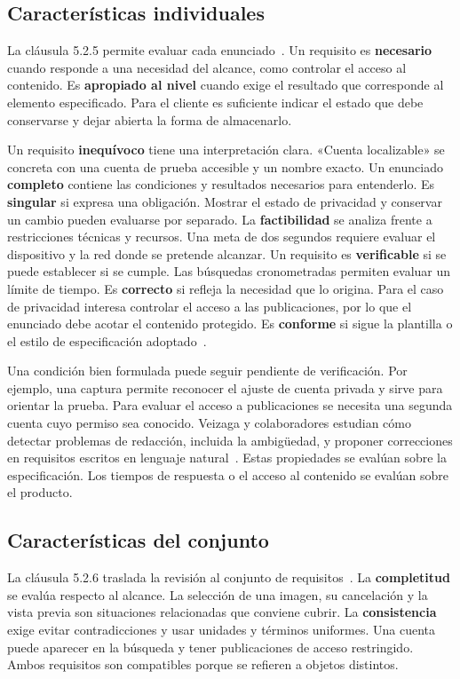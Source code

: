 \documentclass[11pt,a4paper]{article}
\begin{document}
\subsection{Características individuales}
La cláusula 5.2.5 permite evaluar cada enunciado~\cite[cl. 5.2.5]{iso29148}. Un requisito es \textbf{necesario} cuando responde a una necesidad del alcance, como controlar el acceso al contenido. Es \textbf{apropiado al nivel} cuando exige el resultado que corresponde al elemento especificado. Para el cliente es suficiente indicar el estado que debe conservarse y dejar abierta la forma de almacenarlo.

Un requisito \textbf{inequívoco} tiene una interpretación clara. «Cuenta localizable» se concreta con una cuenta de prueba accesible y un nombre exacto. Un enunciado \textbf{completo} contiene las condiciones y resultados necesarios para entenderlo. Es \textbf{singular} si expresa una obligación. Mostrar el estado de privacidad y conservar un cambio pueden evaluarse por separado.
La \textbf{factibilidad} se analiza frente a restricciones técnicas y recursos. Una meta de dos segundos requiere evaluar el dispositivo y la red donde se pretende alcanzar. Un requisito es \textbf{verificable} si se puede establecer si se cumple. Las búsquedas cronometradas permiten evaluar un límite de tiempo. Es \textbf{correcto} si refleja la necesidad que lo origina. Para el caso de privacidad interesa controlar el acceso a las publicaciones, por lo que el enunciado debe acotar el contenido protegido. Es \textbf{conforme} si sigue la plantilla o el estilo de especificación adoptado~\cite[cl. 5.2.5]{iso29148}.

Una condición bien formulada puede seguir pendiente de verificación. Por ejemplo, una captura permite reconocer el ajuste de cuenta privada y sirve para orientar la prueba. Para evaluar el acceso a publicaciones se necesita una segunda cuenta cuyo permiso sea conocido. Veizaga y colaboradores estudian cómo detectar problemas de redacción, incluida la ambigüedad, y proponer correcciones en requisitos escritos en lenguaje natural~\cite{veizaga2024}. Estas propiedades se evalúan sobre la especificación. Los tiempos de respuesta o el acceso al contenido se evalúan sobre el producto.

\subsection{Características del conjunto}
La cláusula 5.2.6 traslada la revisión al conjunto de requisitos~\cite[cl. 5.2.6]{iso29148}. La \textbf{completitud} se evalúa respecto al alcance. La selección de una imagen, su cancelación y la vista previa son situaciones relacionadas que conviene cubrir. La \textbf{consistencia} exige evitar contradicciones y usar unidades y términos uniformes. Una cuenta puede aparecer en la búsqueda y tener publicaciones de acceso restringido. Ambos requisitos son compatibles porque se refieren a objetos distintos.
\end{document}
